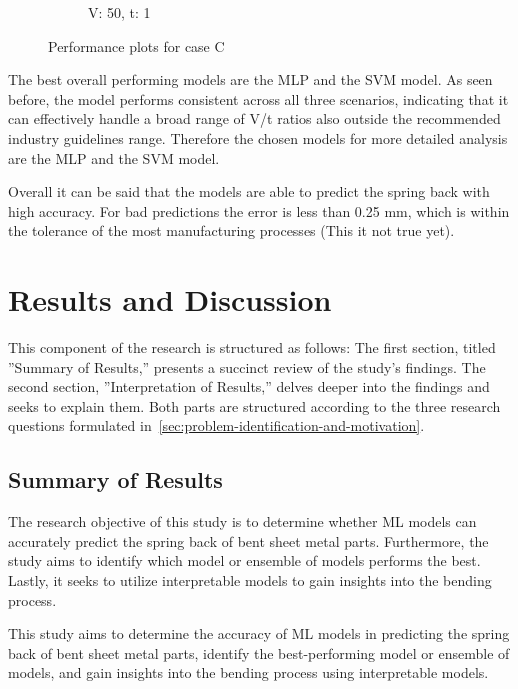 \begin{figure}[h]
\begin{tcolorbox}[arc=0pt,boxrule=0.5pt]
\begin{subfigure}{0.5\textwidth}
            \caption{V: 50, t: 1}
            \label{fig:performance-50_1}
        \end{subfigure}
    \end{tcolorbox}
    \caption{Performance plots for case C}
    \label{fig:performance-case-c}
\end{figure}

The best overall performing models are the \ac{MLP} and the \ac{SVM} model.
As seen before, the model performs consistent across all three scenarios, indicating that it can
effectively handle a broad range of V/t ratios also outside the recommended industry guidelines
range.
Therefore the chosen models for more detailed analysis are the \ac{MLP} and the \ac{SVM} model.

Overall it can be said that the models are able to predict the spring back with high accuracy.
For bad predictions the error is less than 0.25 mm, which is within the tolerance of the
most manufacturing processes (This it not true yet).


\section{Results and Discussion}\label{sec:results-and-discussion}
This component of the research is structured as follows:
The first section, titled ''Summary of Results,'' presents a succinct review of the study's findings. The second
section, ''Interpretation of Results,'' delves deeper into the findings and seeks to explain them.
Both parts are structured according to the three research questions formulated
in~\ref{sec:problem-identification-and-motivation}.

\subsection{Summary of Results}\label{subsec:summary-of-results}
The research objective of this study is to determine whether \ac{ML} models can accurately predict the spring back of
bent sheet metal parts.
Furthermore, the study aims to identify which model or ensemble of models performs the best.
Lastly, it seeks to utilize interpretable models to gain insights into the bending process.


This study aims to determine the accuracy of \ac{ML} models in predicting the spring back of bent sheet metal parts,
identify the best-performing model or ensemble of models, and gain insights into the bending process using
interpretable models.

